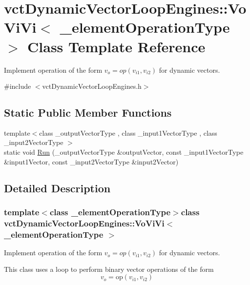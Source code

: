 \hypertarget{classvct_dynamic_vector_loop_engines_1_1_vo_vi_vi}{}\section{vct\+Dynamic\+Vector\+Loop\+Engines\+:\+:Vo\+Vi\+Vi$<$ \+\_\+element\+Operation\+Type $>$ Class Template Reference}
\label{classvct_dynamic_vector_loop_engines_1_1_vo_vi_vi}


Implement operation of the form $v_o = op(v_{i1}, v_{i2})$ for dynamic vectors.  




{\ttfamily \#include $<$vct\+Dynamic\+Vector\+Loop\+Engines.\+h$>$}

\subsection*{Static Public Member Functions}
\begin{DoxyCompactItemize}
\item 
{\footnotesize template$<$class \+\_\+output\+Vector\+Type , class \+\_\+input1\+Vector\+Type , class \+\_\+input2\+Vector\+Type $>$ }\\static void \hyperlink{classvct_dynamic_vector_loop_engines_1_1_vo_vi_vi_a908a77f7ed8af039a3c0cdbe36be2757}{Run} (\+\_\+output\+Vector\+Type \&output\+Vector, const \+\_\+input1\+Vector\+Type \&input1\+Vector, const \+\_\+input2\+Vector\+Type \&input2\+Vector)
\end{DoxyCompactItemize}


\subsection{Detailed Description}
\subsubsection*{template$<$class \+\_\+element\+Operation\+Type$>$class vct\+Dynamic\+Vector\+Loop\+Engines\+::\+Vo\+Vi\+Vi$<$ \+\_\+element\+Operation\+Type $>$}

Implement operation of the form $v_o = op(v_{i1}, v_{i2})$ for dynamic vectors. 

This class uses a loop to perform binary vector operations of the form \[ v_o = \mathrm{op}(v_{i1}, v_{i2}) \]

